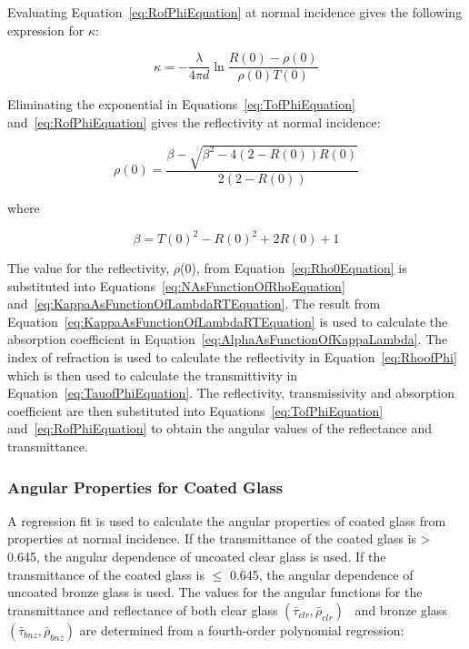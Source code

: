 Evaluating Equation~\ref{eq:RofPhiEquation} at normal incidence gives the following expression for \(\kappa\):

\begin{equation}
\kappa  =  - \frac{\lambda }{{4\pi d}}\ln \frac{{R(0) - \rho (0)}}{{\rho (0)T(0)}}
\label{eq:KappaAsFunctionOfLambdaRTEquation}
\end{equation}

Eliminating the exponential in Equations~\ref{eq:TofPhiEquation} and~\ref{eq:RofPhiEquation} gives the reflectivity at normal incidence:

\begin{equation}
\rho (0) = \frac{{\beta  - \sqrt {{\beta ^2} - 4(2 - R(0))R(0)} }}{{2(2 - R(0))}}
\label{eq:Rho0Equation}
\end{equation}

where

\begin{equation}
\beta  = T{(0)^2} - R{(0)^2} + 2R(0) + 1
\end{equation}

The value for the reflectivity, \(\rho\)(0), from Equation~\ref{eq:Rho0Equation} is substituted into Equations~\ref{eq:NAsFunctionOfRhoEquation} and~\ref{eq:KappaAsFunctionOfLambdaRTEquation}. The result from Equation~\ref{eq:KappaAsFunctionOfLambdaRTEquation} is used to calculate the absorption coefficient in Equation~\ref{eq:AlphaAsFunctionOfKappaLambda}. The index of refraction is used to calculate the reflectivity in Equation~\ref{eq:RhoofPhi} which is then used to calculate the transmittivity in Equation~\ref{eq:TauofPhiEquation}. The reflectivity, transmissivity and absorption coefficient are then substituted into Equations~\ref{eq:TofPhiEquation} and~\ref{eq:RofPhiEquation} to obtain the angular values of the reflectance and transmittance.

\subsubsection{Angular Properties for Coated Glass}\label{angular-properties-for-coated-glass}

A regression fit is used to calculate the angular properties of coated glass from properties at normal incidence. If the transmittance of the coated glass is \textgreater{} 0.645, the angular dependence of uncoated clear glass is used. If the transmittance of the coated glass is \(\leq\) 0.645, the angular dependence of uncoated bronze glass is used. The values for the angular functions for the transmittance and reflectance of both clear glass \(({\bar \tau_{clr}},{\bar \rho_{clr}})\) ~and bronze glass \(({\bar \tau_{bnz}},{\bar \rho_{bnz}})\) are determined from a fourth-order polynomial regression:

